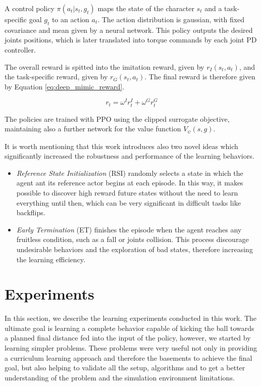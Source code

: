 A control policy $\pi (a_t|s_t,g_t)$ maps the state of the character $s_t$ and a task-specific goal $g_t$ to an action $a_t$. The action distribution is gaussian, with fixed covariance and mean given by a neural network. This policy outputs the desired joints positions, which is later translated into torque commands by each joint PD controller.

The overall reward is spitted into the imitation reward, given by $r_I(s_t,a_t)$, and the task-specific reward, given by $r_G(s_t,a_t)$. The final reward is therefore given by Equation \eqref{eq:deep_mimic_reward}.

\begin{equation}
r_t = \omega^I r_t^I + \omega^G r_t^G
\label{eq:deep_mimic_reward}
\end{equation}

The policies are trained with PPO using the clipped surrogate objective, maintaining also a further network for the value function $V_{\psi}(s,g)$.

It is worth mentioning that this work introduces also two novel ideas which significantly increased the robustness and performance of the learning behaviors. 

\begin{itemize}
\item \textit{Reference State Initialization} (RSI) randomly selects a state in which the agent ant its reference actor begins at each episode. In this way, it makes possible to discover high reward future states without the need to learn everything until then, which can be very significant in difficult tasks like backflips.

\item \textit{Early Termination} (ET) finishes the episode when the agent reaches any fruitless condition, such as a fall or joints collision. This process discourage undesirable behaviors and the exploration of bad states, therefore increasing the learning efficiency.
\end{itemize}

\section{Experiments}

In this section, we describe the learning experiments conducted in this work. The ultimate goal is learning a complete behavior capable of kicking the ball towards a planned final distance fed into the input of the policy, however, we started by learning simpler problems. These problems were very useful not only in providing a curriculum learning approach \cite{BengioCurrLearning} and therefore the basements to achieve the final goal, but also helping to validate all the setup, algorithms and to get a better understanding of the problem and the simulation environment limitations.

